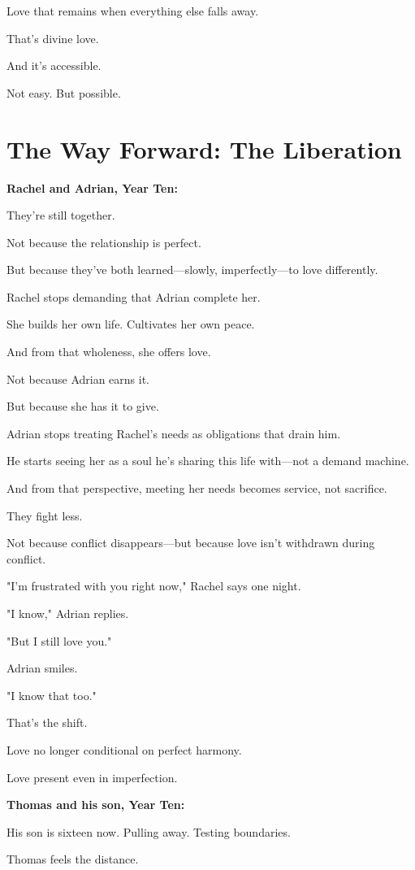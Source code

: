 \documentclass[11pt,twoside]{book}
\begin{document}
Love that remains when everything else falls away.

That's divine love.

And it's accessible.

Not easy. But possible.

\section*{The Way Forward: The Liberation}

\textbf{\textbf{Rachel and Adrian, Year Ten:}}

They're still together.

Not because the relationship is perfect.

But because they've both learned—slowly, imperfectly—to love differently.

Rachel stops demanding that Adrian complete her.

She builds her own life. Cultivates her own peace.

And from that wholeness, she offers love.

Not because Adrian earns it.

But because she has it to give.

Adrian stops treating Rachel's needs as obligations that drain him.

He starts seeing her as a soul he's sharing this life with—not a demand machine.

And from that perspective, meeting her needs becomes service, not sacrifice.

They fight less.

Not because conflict disappears—but because love isn't withdrawn during conflict.

"I'm frustrated with you right now," Rachel says one night.

"I know," Adrian replies.

"But I still love you."

Adrian smiles.

"I know that too."

That's the shift.

Love no longer conditional on perfect harmony.

Love present even in imperfection.

\textbf{\textbf{Thomas and his son, Year Ten:}}

His son is sixteen now. Pulling away. Testing boundaries.

Thomas feels the distance.
\end{document}
